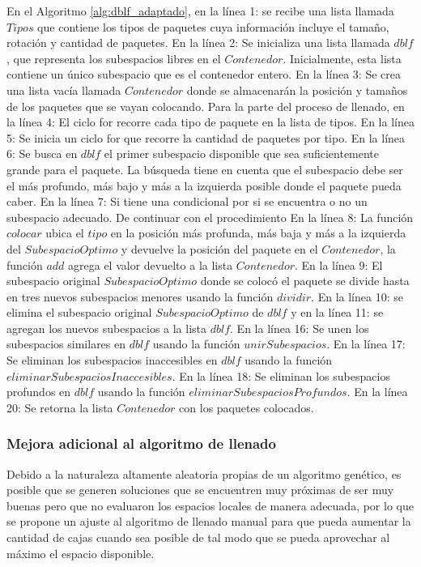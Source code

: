 En el Algoritmo \ref{alg:dblf_adaptado}, en la línea 1: se recibe una lista llamada $Tipos$ que contiene los tipos de paquetes cuya información incluye el tamaño, rotación y cantidad de paquetes. En la línea 2: Se inicializa una lista llamada $dblf$, que representa los subespacios libres en el $Contenedor$. Inicialmente, esta lista contiene un único subespacio que es el contenedor entero. En la línea 3: Se crea una lista vacía llamada $Contenedor$ donde se almacenarán la posición y tamaños de los paquetes que se vayan colocando. Para la parte del proceso de llenado, en la línea 4: El ciclo for recorre cada tipo de paquete en la lista de tipos. En la línea 5: Se inicia un ciclo for que recorre la cantidad de paquetes por tipo. En la línea 6: Se busca en $dblf$ el primer subespacio disponible que sea suficientemente grande para el paquete. La búsqueda tiene en cuenta que el subespacio debe ser el más profundo, más bajo y más a la izquierda posible donde el paquete pueda caber. En la línea 7: Si tiene una condicional por si se encuentra o no un subespacio adecuado. De continuar con el procedimiento En la línea 8: La función $colocar$ ubica el $tipo$ en la posición más profunda, más baja y más a la izquierda del $SubespacioOptimo$ y devuelve la posición del paquete en el $Contenedor$, la función $add$ agrega el valor devuelto a la lista $Contenedor$. En la línea 9: El subespacio original $SubespacioOptimo$ donde se colocó el paquete se divide hasta en tres nuevos subespacios menores usando la función $dividir$. En la línea 10: se elimina el subespacio original $SubespacioOptimo$ de $dblf$ y en la línea 11: se agregan los nuevos subespacios a la lista $dblf$. En la línea 16: Se unen los subespacios similares en $dblf$ usando la función $unirSubespacios$. En la línea 17: Se eliminan los subespacios inaccesibles en $dblf$ usando la función $eliminarSubespaciosInaccesibles$. En la línea 18: Se eliminan los subespacios profundos en $dblf$ usando la función $eliminarSubespaciosProfundos$. En la línea 20: Se retorna la lista $Contenedor$ con los paquetes colocados.

\subsubsection{Mejora adicional al algoritmo de llenado}

Debido a la naturaleza altamente aleatoria propias de un algoritmo genético, es posible que se generen soluciones que se encuentren muy próximas de ser muy buenas pero que no evaluaron los espacios locales de manera adecuada, por lo que se propone un ajuste al algoritmo de llenado manual para que pueda aumentar la cantidad de cajas cuando sea posible de tal modo que se pueda aprovechar al máximo el espacio disponible.


